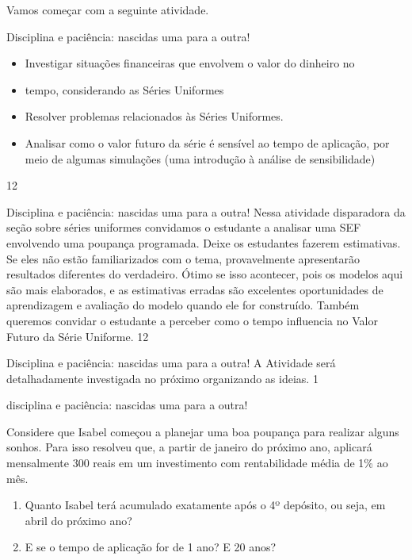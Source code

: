 Vamos começar com a seguinte atividade.
\clearpage
\begin{objectives}{Disciplina e paciência: nascidas uma para a outra!}
{
\begin{itemize}
\item Investigar situações financeiras que envolvem o valor do dinheiro no \item tempo, considerando as Séries Uniformes
\item Resolver problemas relacionados às Séries Uniformes.
\item Analisar como o valor futuro da série é sensível ao tempo de aplicação, por meio de algumas simulações (uma introdução à análise de sensibilidade)
\end{itemize}
}{1}{2}
\end{objectives}
\begin{sugestions}{Disciplina e paciência: nascidas uma para a outra!}
{
Nessa atividade disparadora da seção sobre séries uniformes convidamos o estudante a analisar uma SEF envolvendo uma poupança programada. Deixe os estudantes fazerem estimativas. Se eles não estão familiarizados com o tema, provavelmente apresentarão resultados diferentes do verdadeiro. Ótimo se isso acontecer, pois os modelos aqui são mais elaborados, e as estimativas erradas são excelentes oportunidades de aprendizagem e avaliação do modelo quando ele for construído.
Também queremos convidar o estudante a perceber como o tempo influencia no Valor Futuro da Série Uniforme. 
}{1}{2}
\end{sugestions}
\begin{answer}{Disciplina e paciência: nascidas uma para a outra!}
{
A Atividade será detalhadamente investigada no próximo organizando as ideias.
}{1}
\end{answer}

\begin{task}{disciplina e paciência: nascidas uma para a outra!}
\label{fin-ativ-21}

Considere que Isabel começou a planejar uma boa poupança para realizar alguns sonhos. Para isso resolveu que, a partir de janeiro do próximo ano, aplicará mensalmente 300 reais em um investimento com rentabilidade média de 1\% ao mês. 

\begin{enumerate}
\item Quanto Isabel terá acumulado exatamente após o 4º depósito, ou seja, em abril do próximo ano?
\item E se o tempo de aplicação for de 1 ano? E 20 anos?
\end{enumerate} 

\end{task}

